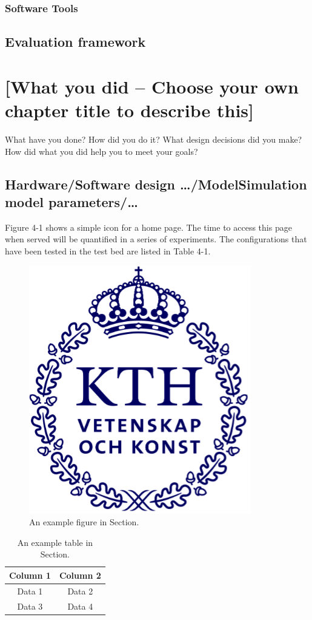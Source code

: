 \documentclass[a4paper,12pt,twocolumn]{article}
\numberwithin{figure}{section}
\numberwithin{table}{section}
\begin{document}
\subsubsection{Software Tools}


\subsection{Evaluation framework}




\section{[What you did – Choose your own chapter title to describe this]}
What have you done? How did you do it? What design decisions did you make? How did what you
did help you to meet your goals?

\subsection{Hardware/Software design …/ModelSimulation model parameters/…}
Figure 4-1 shows a simple icon for a home page. The time to access this page when served will be
quantified in a series of experiments. The configurations that have been tested in the test bed are
listed in Table 4-1.
\begin{figure}[htbp]
    \centering
    \includegraphics[width=0.4\linewidth]{kthLogga.png}  %
    \caption{An example figure in Section.}
    \label{fig:ldone}  
\end{figure}

\begin{table}[htbp]
    \centering
    \begin{tabular}{|c|c|}
        \hline
        Column 1 & Column 2 \\
        \hline
        Data 1 & Data 2 \\
        Data 3 & Data 4 \\
        \hline
    \end{tabular}
    \caption{An example table in Section.}
    \label{tab:done}  
\end{table}
\end{document}
